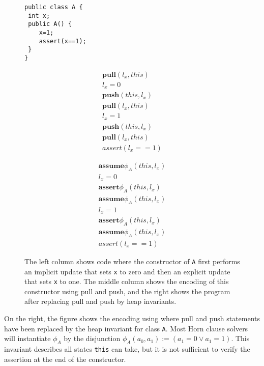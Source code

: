 \begin{figure}[ht]
\centering
\begin{minipage}{.3\textwidth}
\begin{lstlisting}
public class A {
 int x;
 public A() {
 	x=1;
 	assert(x==1);
 }
}
\end{lstlisting}
\end{minipage}
\begin{minipage}{.3\textwidth}
\begin{align*}
\textbf{pull}(l_x, this)\\
l_x = 0 \\
\textbf{push}(this, l_x)\\
\textbf{pull}(l_x, this)\\
l_x = 1 \\
\textbf{push}(this, l_x)\\
\textbf{pull}(l_x, this)\\
assert (l_x==1)
\end{align*}
\end{minipage}
\begin{minipage}{.3\textwidth}
\begin{align*}
\textbf{assume} \phi_A(this, l_x)\\
l_x = 0 \\
\textbf{assert}\phi_A(this, l_x)\\
\textbf{assume}\phi_A(this, l_x)\\
l_x = 1 \\
\textbf{assert}\phi_A(this, l_x)\\
\textbf{assume}\phi_A(this, l_x)\\
assert (l_x==1)
\end{align*}
\end{minipage}
\caption{The left column shows code where the constructor of \texttt{A} first performs an implicit update that sets \texttt{x} to zero and then an explicit update that sets \texttt{x} to one. The middle column shows the encoding of
this constructor using pull and push, and the right shows the program after replacing pull and push by heap invariants.}
\label{fig-update}
\end{figure}

On the right, the figure shows the encoding using where pull and push statements have been 
replaced by the heap invariant for class \texttt{A}. Most Horn clause solvers will
instantiate $\phi_A$ by the disjunction $\phi_A(a_0, a_1) := (a_1=0\vee a_1=1)$. This invariant describes all states \texttt{this} can take, but it is not sufficient to verify the assertion at the end of the constructor. 

